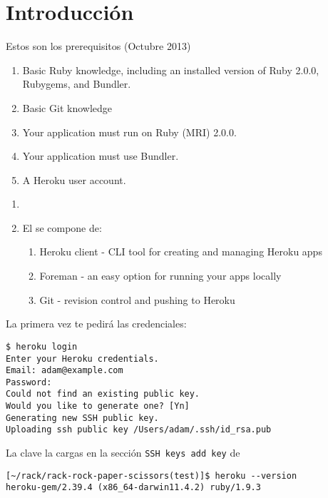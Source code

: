 
\section{Introducción}


Estos son los prerequisitos (Octubre 2013)
\begin{enumerate}
\item 
Basic Ruby knowledge, including an installed version of Ruby 2.0.0, Rubygems, and Bundler.
\item 
Basic Git knowledge
\item 
Your application must run on Ruby (MRI) 2.0.0.
\item 
Your application must use Bundler.
\item 
A Heroku user account. 
\end{enumerate}


\begin{enumerate}
\item 
{}
\item El
se compone de:
  \begin{enumerate}
  \item 
  Heroku client - CLI tool for creating and managing Heroku apps
  \item 
  Foreman - an easy option for running your apps locally
  \item 
  Git - revision control and pushing to Heroku
  \end{enumerate}
\end{enumerate}

La primera vez te pedirá las credenciales:
\begin{verbatim}
$ heroku login
Enter your Heroku credentials.
Email: adam@example.com
Password: 
Could not find an existing public key.
Would you like to generate one? [Yn] 
Generating new SSH public key.
Uploading ssh public key /Users/adam/.ssh/id_rsa.pub
\end{verbatim}
La clave la cargas en la sección \verb|SSH keys add key| de

\begin{verbatim}
[~/rack/rack-rock-paper-scissors(test)]$ heroku --version
heroku-gem/2.39.4 (x86_64-darwin11.4.2) ruby/1.9.3
\end{verbatim}


